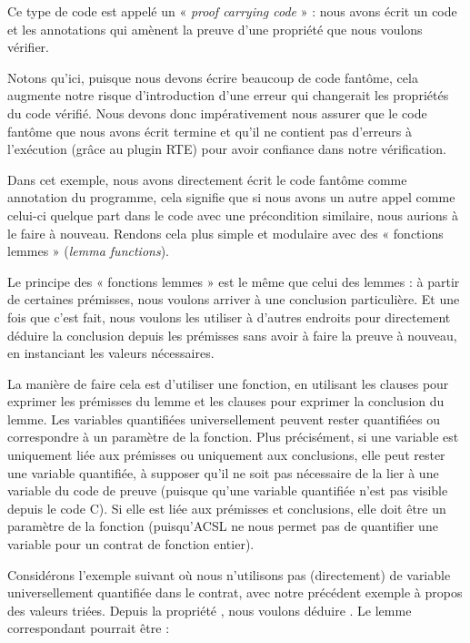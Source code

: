 



Ce type de code est appelé un « \textit{proof carrying code} » : nous avons écrit
un code et les annotations qui amènent la preuve d'une propriété que nous voulons
vérifier.


Notons qu'ici, puisque nous devons écrire beaucoup de code fantôme, cela augmente
notre risque d'introduction d'une erreur qui changerait les propriétés du code
vérifié. Nous devons donc impérativement nous assurer que le code fantôme que
nous avons écrit termine et qu'il ne contient pas d'erreurs à l'exécution
(grâce au plugin RTE) pour avoir confiance dans notre vérification.


Dans cet exemple, nous avons directement écrit le code fantôme comme annotation du
programme, cela signifie que si nous avons un autre appel comme celui-ci quelque
part dans le code avec une précondition similaire, nous aurions à le faire à
nouveau. Rendons cela plus simple et modulaire avec des « fonctions lemmes »
(\textit{lemma functions}).





Le principe des « fonctions lemmes » est le même que celui des lemmes : à
partir de certaines prémisses, nous voulons arriver à une conclusion particulière.
Et une fois que c'est fait, nous voulons les utiliser à d'autres endroits pour
directement déduire la conclusion depuis les prémisses sans avoir à faire la
preuve à nouveau, en instanciant les valeurs nécessaires.


La manière de faire cela est d'utiliser une fonction, en utilisant les clauses
 pour exprimer les prémisses du lemme et les clauses
 pour exprimer la conclusion du lemme. Les variables
quantifiées universellement peuvent rester quantifiées ou correspondre à un
paramètre de la fonction. Plus précisément, si une variable est uniquement liée
aux prémisses ou uniquement aux conclusions, elle peut rester une variable
quantifiée, à supposer qu'il ne soit pas nécessaire de la lier à une variable
du code de preuve (puisque qu'une variable quantifiée n'est pas visible depuis
le code C). Si elle est liée aux prémisses et conclusions, elle doit être un
paramètre de la fonction (puisqu'ACSL ne nous permet pas de quantifier une
variable pour un contrat de fonction entier).


Considérons l'exemple suivant où nous n'utilisons pas (directement) de
variable universellement quantifiée dans le contrat, avec notre précédent
exemple à propos des valeurs triées. Depuis la propriété
, nous voulons déduire
. Le lemme correspondant pourrait être :


